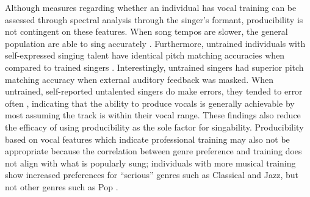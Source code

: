 Although measures regarding whether an individual has vocal training can be assessed through spectral analysis through the singer's formant, producibility is not contingent on these features. When song tempos are slower, the general population are able to sing accurately \cite{DallaBella2007}. Furthermore, untrained individuals with self-expressed singing talent have identical pitch matching accuracies when compared to trained singers \cite{Watts2003}. Interestingly, untrained singers had superior pitch matching accuracy when external auditory feedback was masked. When untrained, self-reported untalented singers do make errors, they tended to error often \cite{DallaBella2007}, indicating that the ability to produce vocals is generally achievable by most assuming the track is within their vocal range. These findings also reduce the efficacy of using producibility as the sole factor for singability. Producibility based on vocal features which indicate professional training may also not be appropriate because the correlation between genre preference and training does not align with what is popularly sung; individuals with more musical training show increased preferences for ``serious'' genres such as Classical and Jazz, but not other genres such as Pop \cite{Hargreaves1995}.

 


